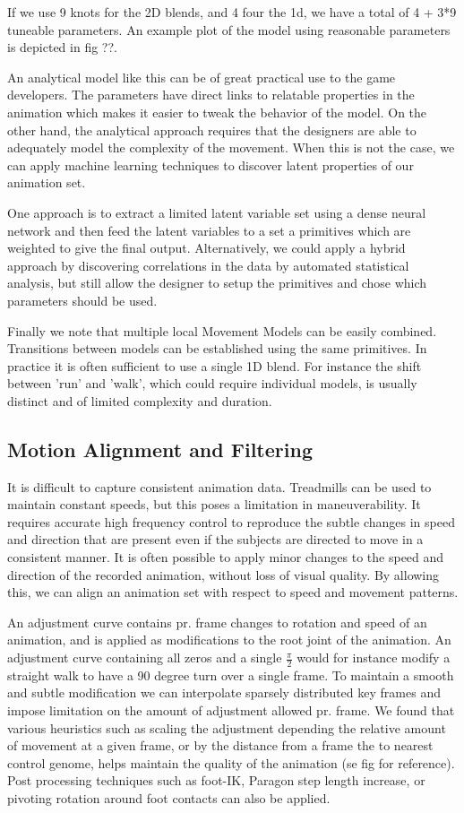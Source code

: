 If we use 9 knots for the 2D blends, and 4 four the 1d, we have a total of 4 + 3*9 tuneable parameters. An example plot of the model using reasonable parameters is depicted in fig ??.

An analytical model like this can be of great practical use to the game developers. The parameters have direct links to relatable properties in the animation which makes it easier to tweak the behavior of the model. On the other hand, the analytical approach requires that the designers are able to adequately model the complexity of the movement. When this is not the case, we can apply machine learning techniques to discover latent properties of our animation set. 

One approach is to extract a limited latent variable set using a dense neural network and then feed the latent variables to a set a primitives which are weighted to give the final output. 
Alternatively, we could apply a hybrid approach by discovering correlations in the data by automated statistical analysis, but still allow the designer to setup the primitives and chose which parameters should be used. 

Finally we note that multiple local Movement Models can be easily combined. Transitions between models can be established using the same primitives. In practice it is often sufficient to use a single 1D blend. For instance the shift between 'run' and 'walk', which could require individual models, is usually distinct and of limited complexity and duration. 

\subsection{Motion Alignment and Filtering}
It is difficult to capture consistent animation data. Treadmills can be used to maintain constant speeds, but this poses a limitation in maneuverability. It requires accurate high frequency control to reproduce the subtle changes in speed and direction that are present even if the subjects are directed to move in a consistent manner. It is often possible to apply minor changes to the speed and direction of the recorded animation, without loss of visual quality. By allowing this, we can align an animation set with respect to speed and movement patterns. 

An adjustment curve contains pr. frame changes to rotation and speed of an animation, and is applied as modifications to the root joint of the animation. An adjustment curve containing all zeros and a single $\frac{\pi}{2}$ would for instance modify a straight walk to have a 90 degree turn over a single frame. To maintain a smooth and subtle modification we can interpolate sparsely distributed key frames and impose limitation on the amount of adjustment allowed pr. frame. We found that various heuristics such as scaling the adjustment depending the relative amount of movement at a given frame, or by the distance from a frame the to nearest control genome, helps maintain the quality of the animation (se fig for reference). Post processing techniques such as foot-IK, Paragon step length increase, or pivoting rotation around foot contacts can also be applied.

